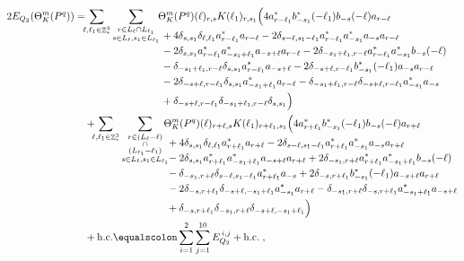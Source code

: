 \documentclass[12pt,a4paper]{article}
\numberwithin{equation}{section}
\newcommand{\1}{\mathbb{I}}
\DeclareMathOperator{\Z}{\mathbb{Z}}
\theoremstyle{plain}
\theoremstyle{definition}
\theoremstyle{remark}
\theoremstyle{plain}
\theoremstyle{definition}
\theoremstyle{remark}
\begin{document}
\begin{alignat}{2}
	2E_{Q_2}(\Theta^m_{K}(P^q)) &=
	\!\!\!\sum\limits_{\ell,\ell_1 \in \Z^3_*}\sum\limits_{\substack{r\in L_{\ell} \cap L_{\ell_1}\\ s \in L_{\ell},s_1\in L_{\ell_1}}} \!\!\!\begin{aligned}[t] &\Theta^m_{K}(P^q)(\ell)_{r,s}K(\ell_1)_{r,s_1}\Big( 4a^*_{r-\ell_1}b^*_{-s_1}(-\ell_1)b_{-s}(-\ell)a_{r-\ell} \nonumber\\ 
		&\;+ 4\delta_{s,s_1} \delta_{\ell,\ell_1 } a^*_{r-\ell_1} a_{r-\ell} -2\delta_{s-\ell,s_1-\ell_1}a^*_{r-\ell_1} a^*_{-s_1} a_{-s} a_{r-\ell} \nonumber\\
		&\;-2\delta_{s,s_1}a^*_{r-\ell_1} a^*_{-s_1+\ell_1}a_{-s+\ell} a_{r-\ell} - 2\delta_{-s_1+\ell_1,r-\ell} a^*_{r-\ell_1} a^*_{-s_1} b_{-s}(-\ell)\nonumber\\
		&\;-\delta_{-s_1+\ell_1,r-\ell}\delta_{s,s_1}a^*_{r-\ell_1}a_{-s+\ell} - 2\delta_{-s+\ell,r-\ell_1}b^*_{-s_1}(-\ell_1)a_{-s}a_{r-\ell} \nonumber\\
		&\;-2\delta_{-s+\ell,r-\ell_1}\delta_{s,s_1}a^*_{-s_1+\ell_1} a_{r-\ell} - \delta_{-s_1+\ell_1,r-\ell}\delta_{-s+\ell,r-\ell_1}a^*_{-s_1}a_{-s} \nonumber\\
		&\;+\delta_{-s+\ell,r-\ell_1}\delta_{-s_1+\ell_1,r-\ell}\delta_{s,s_1}  \Big)    
	\end{aligned}\\
	&\quad +\!\!\!\sum\limits_{\ell,\ell_1 \in \Z^3_*}\sum\limits_{\substack{r\in (L_{\ell}-\ell)\\ \cap \\(L_{\ell_1}-\ell_1)\\ s \in L_{\ell},s_1\in L_{\ell_1}}}\!\!\!\!\!\begin{aligned}[t] &\Theta^m_{K}(P^q)(\ell)_{r+\ell,s}K(\ell_1)_{r+\ell_1,s_1}\Big(4a^*_{r+\ell_1}b^*_{-s_1}(-\ell_1)b_{-s}(-\ell)a_{r+\ell} \nonumber\\
		&\;+ 4\delta_{s,s_1} \delta_{\ell,\ell_1 } a^*_{r+\ell_1} a_{r+\ell} -2\delta_{s-\ell,s_1-\ell_1}a^*_{r+\ell_1} a^*_{-s_1} a_{-s} a_{r+\ell} \nonumber\\
		&\;-2\delta_{s,s_1}a^*_{r+\ell_1} a^*_{-s_1+\ell_1}a_{-s+\ell} a_{r+\ell} + 2 \delta_{-s_1, r+\ell}a^*_{r+\ell_1}a^*_{-s_1+\ell_1}b_{-s}(-\ell)\nonumber\\
		&\;-\delta_{-s_1,r+\ell}\delta_{s-\ell,s_1-\ell_1}a^*_{r+\ell_1}a_{-s} + 2\delta_{-s,r+\ell_1}b^*_{-s_1}(-\ell_1)a_{-s+\ell}a_{r+\ell} \nonumber\\
		&\;-2\delta_{-s,r+\ell_1}\delta_{-s+\ell,-s_1+\ell_1}a^*_{-s_1}a_{r+\ell} - \delta_{-s_1,r+\ell}\delta_{-s,r+\ell_1}a^*_{-s_1+\ell_1}a_{-s+\ell}\nonumber\\
		&\;+ \delta_{-s,r+\ell_1} \delta_{-s_1,r+\ell} \delta_{-s+\ell,-s_1+\ell_1} \Big)  
	\end{aligned}\\
	&\quad +\mathrm{h.c.} \equalscolon \sum\limits_{i=1}^{2}\sum\limits_{j=1}^{10} E_{Q_2}^{\,i,j} + \mathrm{h.c.} \label{eq:EQ2_expansion} \;,
\end{alignat}
\end{document}
